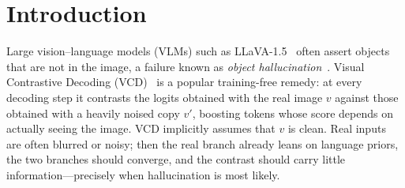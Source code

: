 \documentclass[10pt,a4paper]{article}
\begin{document}
\section{Introduction}
Large vision--language models (VLMs) such as LLaVA-1.5~\citep{liu2024improved} often assert objects that are not in the image, a failure known as \emph{object hallucination}~\citep{rohrbach2018chair,li2023pope}. Visual Contrastive Decoding (VCD)~\citep{leng2024vcd} is a popular training-free remedy: at every decoding step it contrasts the logits obtained with the real image $v$ against those obtained with a heavily noised copy $v'$, boosting tokens whose score depends on actually seeing the image. VCD implicitly assumes that $v$ is clean. Real inputs are often blurred or noisy; then the real branch already leans on language priors, the two branches should converge, and the contrast should carry little information---precisely when hallucination is most likely.
\end{document}
